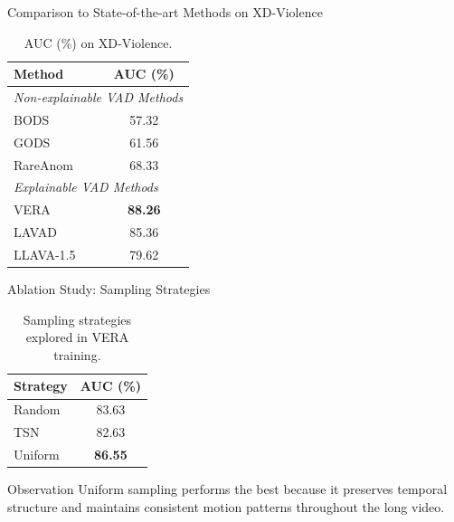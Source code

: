 \documentclass[aspectratio=169,xcolor=dvipsnames]{beamer}
\begin{document}
	\begin{frame}{Comparison to State-of-the-art Methods on XD-Violence}
		\small
		\begin{table}
			\centering
			\renewcommand{\arraystretch}{1.15}
			\setlength{\tabcolsep}{7pt}
			\begin{tabular}{l c}
				\toprule
				\textbf{Method} & \textbf{AUC (\%)} \\
				\midrule
				\multicolumn{2}{l}{\textit{Non-explainable VAD Methods}} \\
				BODS & 57.32 \\
				GODS & 61.56 \\
				RareAnom & 68.33 \\
				\midrule
				\multicolumn{2}{l}{\textit{Explainable VAD Methods}} \\
				VERA & \textbf{88.26} \\
				LAVAD & 85.36 \\
				LLAVA-1.5 & 79.62 \\
				\bottomrule
			\end{tabular}
			\caption{AUC (\%) on XD-Violence.}
		\end{table}
		
		\vspace{-0.5em}
	\end{frame}
	\begin{frame}{Ablation Study: Sampling Strategies}
		\small
		
		\begin{table}
			\centering
			\renewcommand{\arraystretch}{1.2}
			\setlength{\tabcolsep}{10pt}
			\begin{tabular}{l c}
				\toprule
				\textbf{Strategy} & \textbf{AUC (\%)} \\
				\midrule
				Random & 83.63 \\
				TSN  & 82.63 \\
				Uniform & \textbf{86.55} \\
				\bottomrule
			\end{tabular}
			\caption{Sampling strategies explored in VERA training.}
		\end{table}
		
		\begin{block}{Observation}
			Uniform sampling performs the best because it preserves temporal structure and maintains consistent motion patterns throughout the long video.
		\end{block}
	\end{frame}
	
\end{document}
